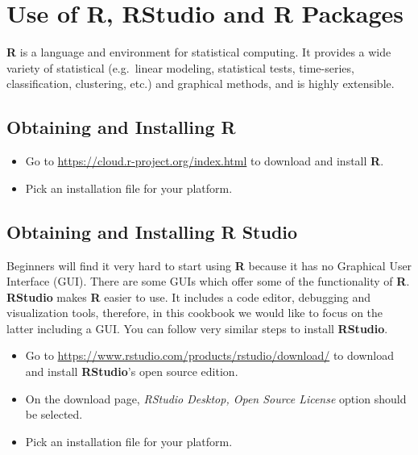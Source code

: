 \documentclass[10pt,b5paper,]{book}
\providecommand{\tightlist}{%
  \setlength{\itemsep}{0pt}\setlength{\parskip}{0pt}}
\theoremstyle{definition}
\theoremstyle{definition}
\theoremstyle{definition}
\theoremstyle{remark}
\begin{document}
\hypertarget{use-of-r-rstudio-and-r-packages}{%
\section{Use of R, RStudio and R
Packages}\label{use-of-r-rstudio-and-r-packages}}

\textbf{R} is a language and environment for statistical computing. It
provides a wide variety of statistical (e.g.~linear modeling,
statistical tests, time-series, classification, clustering, etc.) and
graphical methods, and is highly extensible.

\hypertarget{obtaining-and-installing-r}{%
\subsection{Obtaining and Installing
R}\label{obtaining-and-installing-r}}

\begin{itemize}
\tightlist
\item
  Go to \url{https://cloud.r-project.org/index.html} to download and
  install \textbf{R}.
\item
  Pick an installation file for your platform.
\end{itemize}

\hypertarget{obtaining-and-installing-r-studio}{%
\subsection{Obtaining and Installing R
Studio}\label{obtaining-and-installing-r-studio}}

Beginners will find it very hard to start using \textbf{R} because it
has no Graphical User Interface (GUI). There are some GUIs which offer
some of the functionality of \textbf{R}. \textbf{RStudio} makes
\textbf{R} easier to use. It includes a code editor, debugging and
visualization tools, therefore, in this cookbook we would like to focus
on the latter including a GUI. You can follow very similar steps to
install \textbf{RStudio}.

\begin{itemize}
\tightlist
\item
  Go to \url{https://www.rstudio.com/products/rstudio/download/} to
  download and install \textbf{RStudio}'s open source edition.
\item
  On the download page, \emph{RStudio Desktop, Open Source License}
  option should be selected.
\item
  Pick an installation file for your platform.
\end{itemize}
\end{document}

